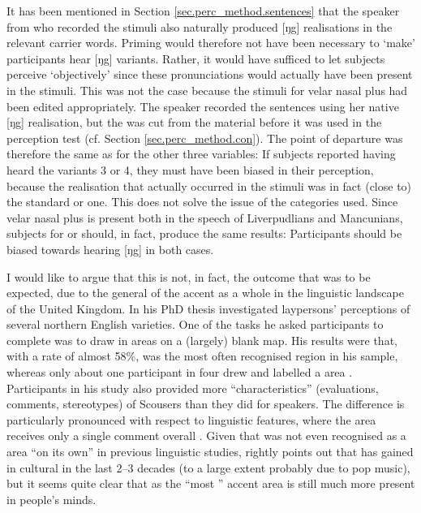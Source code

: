 It has been mentioned in Section \ref{sec.perc_method.sentences} that the speaker from  who recorded the stimuli also naturally produced [ŋg] realisations in the relevant carrier words.
Priming would therefore not have been necessary to `make' participants hear [ŋg] variants.
Rather, it would have sufficed to let subjects perceive `objectively' since these pronunciations would actually have been present in the stimuli.
This was not the case because the stimuli for velar nasal plus had been edited appropriately.
The speaker recorded the sentences using her native [ŋg] realisation, but the  was cut from the material before it was used in the perception test (cf. Section \ref{sec.perc_method.con}).
The point of departure was therefore the same as for the other three variables: If subjects reported having heard the  variants 3 or 4, they must have been biased in their perception, because the realisation that actually occurred in the stimuli was in fact (close to) the standard or  one.
This does not solve the issue of the  categories used.
Since velar nasal plus is present both in the speech of Liverpudlians and Mancunians,  subjects for  or  should, in fact, produce the same results: Participants should be biased towards hearing [ŋg] in both cases.

I would like to argue that this is not, in fact, the outcome that was to be expected, due to the general  of the  accent as a whole in the linguistic landscape of the United Kingdom.
In his \citeyear{montgomery2007} PhD thesis \citeauthor{montgomery2007} investigated laypersons' perceptions of several northern English varieties.
One of the tasks he asked participants to complete was to draw in  areas on a (largely) blank map.
His results were that, with a rate of almost 58\%,  was the most often recognised  region in his sample, whereas only about one participant in four drew and labelled a  area \parencite[cf.][194]{montgomery2007}.
Participants in his study also provided more ``characteristics'' (evaluations, comments, stereotypes) of Scousers than they did for  speakers.
The difference is particularly pronounced with respect to linguistic features, where the  area receives only a single comment overall \parencite[cf.][246--252]{montgomery2007}.
Given that  was not even recognised as a  area ``on its own'' in previous linguistic studies, \textcite[cf.][214--215]{montgomery2007} rightly points out that  has gained in cultural  in the last 2--3 decades (to a large extent probably due to pop music), but it seems quite clear that  as the ``most '' \parencite[216]{montgomery2007} accent area is still much more present in people's minds.


